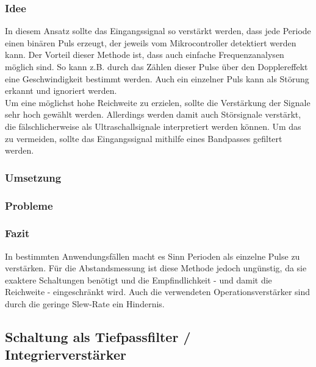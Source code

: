\subsubsection{Idee}
In diesem Ansatz sollte das Eingangssignal so verstärkt werden, dass jede Periode einen binären Puls erzeugt, der jeweils vom Mikrocontroller detektiert werden kann. Der Vorteil dieser Methode ist, dass auch einfache Frequenzanalysen möglich sind. So kann z.B. durch das Zählen dieser Pulse über den Dopplereffekt eine Geschwindigkeit bestimmt werden. Auch ein einzelner Puls kann als Störung erkannt und ignoriert werden.\\
Um eine möglichst hohe Reichweite zu erzielen, sollte die Verstärkung der Signale sehr hoch gewählt werden. Allerdings werden damit auch Störsignale verstärkt, die fälschlicherweise als Ultraschallsignale interpretiert werden können. Um das zu vermeiden, sollte das Eingangssignal mithilfe eines Bandpasses gefiltert werden.

\subsubsection{Umsetzung}


\subsubsection{Probleme}


\subsubsection{Fazit}
In bestimmten Anwendungsfällen macht es Sinn Perioden als einzelne Pulse zu verstärken. Für die Abstandsmessung ist diese Methode jedoch ungünstig, da sie exaktere Schaltungen benötigt und die Empfindlichkeit - und damit die Reichweite - eingeschränkt wird. Auch die verwendeten Operationsverstärker sind durch die geringe Slew-Rate ein Hindernis.



\subsection{Schaltung als Tiefpassfilter / Integrierverstärker}


